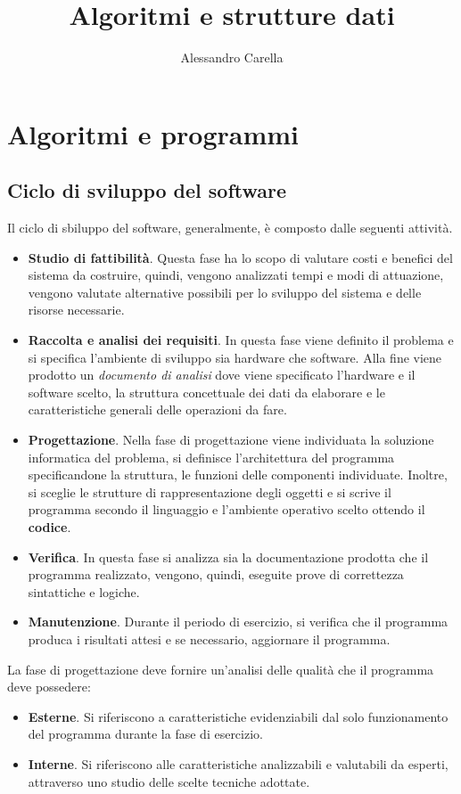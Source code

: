 \documentclass[12pt]{report}
\date{}
\author{Alessandro Carella}
\title{Algoritmi e strutture dati}
\begin{document}
	{
		\let\cleardoublepage\clearpage
		\maketitle
		\tableofcontents
	}
	\chapter{Algoritmi e programmi}
	\section{Ciclo di sviluppo del software}
	Il ciclo di sbiluppo del software, generalmente, è composto dalle seguenti attività.
	\begin{itemize}
		\item \textbf{Studio di fattibilità}. Questa fase ha lo scopo di valutare costi e benefici del sistema da costruire, quindi, vengono analizzati tempi e modi di attuazione, vengono valutate alternative possibili per lo sviluppo del sistema e delle risorse necessarie.
		\item \textbf{Raccolta e analisi dei requisiti}. In questa fase viene definito il problema e si specifica l'ambiente di sviluppo sia hardware che software. Alla fine viene prodotto un \textit{documento di analisi} dove viene specificato l'hardware e il software scelto, la struttura concettuale dei dati da elaborare e le caratteristiche generali delle operazioni da fare.
		\item \textbf{Progettazione}. Nella fase di progettazione viene individuata la soluzione informatica del problema, si definisce l'architettura del programma specificandone la struttura, le funzioni delle componenti individuate. Inoltre, si sceglie le strutture di rappresentazione degli oggetti e si scrive il programma secondo il linguaggio e l'ambiente operativo scelto ottendo il \textbf{codice}.
		\item \textbf{Verifica}. In questa fase si analizza sia la documentazione prodotta che il programma realizzato, vengono, quindi, eseguite prove di correttezza sintattiche e logiche.
		\item \textbf{Manutenzione}. Durante il periodo di esercizio, si verifica che il programma produca i risultati attesi e se necessario, aggiornare il programma.
	\end{itemize}
	La fase di progettazione deve fornire un'analisi delle qualità che il programma deve possedere:
	\begin{itemize}
		\item \textbf{Esterne}. Si riferiscono a caratteristiche evidenziabili dal solo funzionamento del programma durante la fase di esercizio.
		\item \textbf{Interne}. Si riferiscono alle caratteristiche analizzabili e valutabili da esperti, attraverso uno studio delle scelte tecniche adottate.
	\end{itemize}
\end{document}
